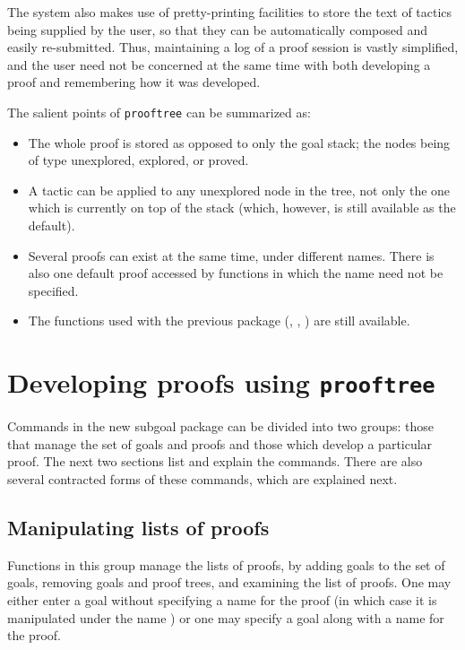 The system also makes use of pretty-printing facilities to store the
text of tactics being supplied by the user, so that they can be
automatically composed and easily re-submitted. Thus, maintaining a
log of a proof session is vastly simplified, and the user need not be
concerned at the same time with both developing a proof and
remembering how it was developed.

The salient points of {\tt prooftree} can be summarized as:
\begin{itemize}
\item
       The whole proof is stored as opposed to only the goal stack;
        the nodes being of type unexplored, explored, or proved.
\item
       A tactic can be applied to any unexplored node in the tree,
        not only the one which is currently on top of the stack
        (which, however, is still available as the default).
\item
       Several proofs can exist at the same time, under different
        names. There is also one default proof accessed by functions
	in which the name need not be specified.
\item
       The functions used with the previous package (,
        , ) are still available.
\end{itemize}

\section{ Developing proofs using {\tt prooftree}}

Commands in the new subgoal package can be divided into two groups:
those that manage the set of goals and proofs and those which develop
a particular proof. The next two sections list and explain the
commands. There are also several contracted forms of these commands,
which are explained next.

\subsection{ Manipulating lists of proofs}

Functions in this group manage the lists of proofs, by adding goals to
the set of goals, removing goals and proof trees, and examining the
list of proofs. One may either enter a goal without specifying a name
for the proof (in which case it is manipulated under the name
) or one may specify a goal along with a name for
the proof. 

